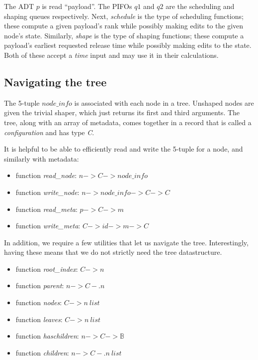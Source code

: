 \documentclass{article}
\begin{document}
The ADT $p$ is read ``payload''. 
The PIFOs $q1$ and $q2$ are the scheduling and shaping queues respectively.
Next, \textit{schedule} is the type of scheduling functions; these compute a given 
payload's rank while possibly making edits to the given node's state.
Similarly, \textit{shape} is the type of shaping functions; these compute a payload's 
earliest requested release time while possibly making edits to the state. 
Both of these accept a \textit{time} input and may use it in their calculations.

\subsection{Navigating the tree}

The 5-tuple $\mathit{node\_info}$ is associated with each node in a tree. 
Unshaped nodes are given the trivial shaper, which just returns its first and third arguments. 
The tree, along with an array of metadata, comes together in a record
that is called a \textit{configuration} and has type \textit{C}.

It is helpful to be able to efficiently read and write the 5-tuple for a node,
and similarly with metadata:
\begin{itemize}
\item function \textit{read\_node}: $n -> C -> \mathit{node\_info}$ 
\item function \textit{write\_node}: $n -> \mathit{node\_info} -> C -> C$ 
\item function \textit{read\_meta}: $p -> C -> m$ 
\item function \textit{write\_meta}: $C -> \mathit{id} -> m -> C$ 
\end{itemize}

In addition, we require a few utilities that let us navigate the tree.
Interestingly, having these means that we do not strictly need the tree datastructure.
\begin{itemize}
\item function \textit{root\_index}: $C -> n$
\item function \textit{parent}: $n -> C -. n$
\item function \textit{nodes}: $C -> n~\mathit{list}$
\item function \textit{leaves}: $C -> n~\mathit{list}$
\item function \textit{haschildren}: $n -> C -> \mathbb{B}$
\item function \textit{children}: $n -> C -. n~\mathit{list}$
\end{itemize}
\end{document}
